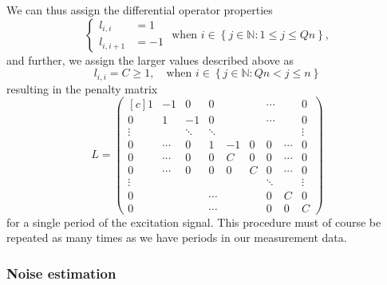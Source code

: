 \documentclass[12pt,a4]{article}
\newcommand{\N}{{\mathbb N}}
\begin{document}
We can thus assign the differential operator properties
\begin{equation*}
\begin{cases}
 l_{i,i}   &= 1 \\
 l_{i,i+1} &= -1 
\end{cases}
\text{ when } i \in \left\{ j \in \N : 1 \leq j \leq Qn \right\} ,
\end{equation*}
and further, we assign the larger values described above as
\begin{equation*}
 l_{i,i} = C \geq 1, \quad \text{when } i \in \left\{ j \in \N : Qn < j \leq n \right\}
\end{equation*}
resulting in the penalty matrix
\begin{equation}
L=
\begin{pmatrix*}[c]
 1      & -1     &  0     & 0       &    &    & \cdots  &        & 0       \\
 0      & 1      & -1     & 0       &    &    & \cdots  &        & 0       \\
 \vdots &        & \ddots & \ddots  &    &    &         &        & \vdots  \\
 0      & \cdots &  0     & 1       & -1 & 0  & 0       & \cdots & 0       \\
 0      & \cdots &  0     & 0       & C  & 0  & 0       & \cdots & 0       \\
 0      & \cdots &  0     & 0       & 0  & C  & 0       & \cdots & 0       \\
 \vdots &        &        &         &    &    & \ddots  &        & \vdots  \\
 0      &        &        & \cdots  &    &    &  0      &  C     & 0       \\
 0      &        &        & \cdots  &    &    &  0      &  0     & C 
\end{pmatrix*}
\end{equation}
for a single period of the excitation signal. This procedure must of course be repeated as many times as we have periods in our measurement data.

\subsubsection{Noise estimation}
\label{sec:noiseEst}
\end{document}
